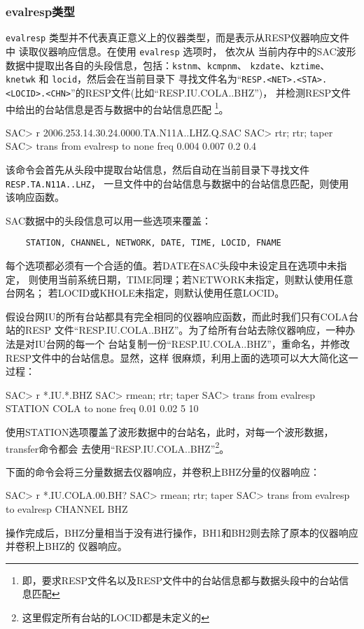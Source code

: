 \subsubsection{evalresp类型}
\texttt{evalresp} 类型并不代表真正意义上的仪器类型，而是表示从RESP仪器响应文件中
读取仪器响应信息。在使用 \texttt{evalresp} 选项时， 依次从
当前内存中的SAC波形数据中提取出各自的头段信息，包括：\texttt{kstnm}、\texttt{kcmpnm}、
\texttt{kzdate}、\texttt{kztime}、\texttt{knetwk} 和 \texttt{locid}，然后会在当前目录下
寻找文件名为``\texttt{RESP.<NET>.<STA>.<LOCID>.<CHN>}''的RESP文件(比如``RESP.IU.COLA..BHZ'')，
并检测RESP文件中给出的台站信息是否与数据中的台站信息匹配
\footnote{即，要求RESP文件名以及RESP文件中的台站信息都与数据头段中的台站信息匹配}。
\begin{SACCode}
SAC> r 2006.253.14.30.24.0000.TA.N11A..LHZ.Q.SAC
SAC> rtr; rtr; taper
SAC> trans from evalresp to none freq 0.004 0.007 0.2 0.4
\end{SACCode}
该命令会首先从头段中提取台站信息，然后自动在当前目录下寻找文件 \texttt{RESP.TA.N11A..LHZ}，
一旦文件中的台站信息与数据中的台站信息匹配，则使用该响应函数。

SAC数据中的头段信息可以用一些选项来覆盖：
\begin{verbatim}
    STATION, CHANNEL, NETWORK, DATE, TIME, LOCID, FNAME
\end{verbatim}
每个选项都必须有一个合适的值。若DATE在SAC头段中未设定且在选项中未指定，
则使用当前系统日期，TIME同理；若NETWORK未指定，则默认使用任意台网名；
若LOCID或KHOLE未指定，则默认使用任意LOCID。

假设台网IU的所有台站都具有完全相同的仪器响应函数，而此时我们只有COLA台站的RESP
文件``RESP.IU.COLA..BHZ''。为了给所有台站去除仪器响应，一种办法是对IU台网的每一个
台站复制一份``RESP.IU.COLA..BHZ''，重命名，并修改RESP文件中的台站信息。显然，这样
很麻烦，利用上面的选项可以大大简化这一过程：
\begin{SACCode}
SAC> r *.IU.*.BHZ
SAC> rmean; rtr; taper
SAC> trans from evalresp STATION COLA to none freq 0.01 0.02 5 10
\end{SACCode}
使用STATION选项覆盖了波形数据中的台站名，此时，对每一个波形数据，transfer命令都会
去使用``RESP.IU.COLA..BHZ''\footnote{这里假定所有台站的LOCID都是未定义的}。

下面的命令会将三分量数据去仪器响应，并卷积上BHZ分量的仪器响应：
\begin{SACCode}
SAC> r *.IU.COLA.00.BH?
SAC> rmean; rtr; taper
SAC> trans from evalresp to evalresp CHANNEL BHZ
\end{SACCode}
操作完成后，BHZ分量相当于没有进行操作，BH1和BH2则去除了原本的仪器响应并卷积上BHZ的
仪器响应。


